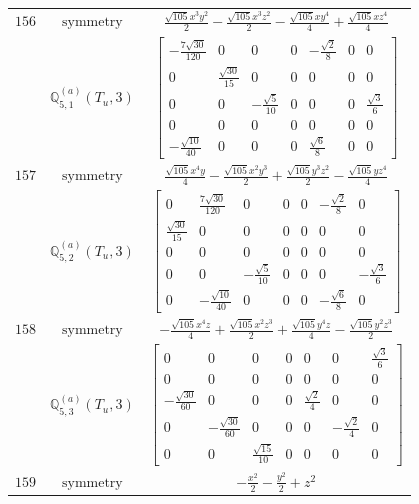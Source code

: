 \documentclass[fleqn,8pt,landscape]{jsarticle}
\begin{document}
\begin{longtable}{ccc}
$ 156 $ & $ \text{symmetry} $ & $ \frac{\sqrt{105} x^{3} y^{2}}{2} - \frac{\sqrt{105} x^{3} z^{2}}{2} - \frac{\sqrt{105} x y^{4}}{4} + \frac{\sqrt{105} x z^{4}}{4} $ \\
$  $ & $ \mathbb{Q}_{5,1}^{(a)}(T_{u},3) $ & $ \begin{bmatrix} - \frac{7 \sqrt{30}}{120} & 0 & 0 & 0 & - \frac{\sqrt{2}}{8} & 0 & 0 \\ 0 & \frac{\sqrt{30}}{15} & 0 & 0 & 0 & 0 & 0 \\ 0 & 0 & - \frac{\sqrt{5}}{10} & 0 & 0 & 0 & \frac{\sqrt{3}}{6} \\ 0 & 0 & 0 & 0 & 0 & 0 & 0 \\ - \frac{\sqrt{10}}{40} & 0 & 0 & 0 & \frac{\sqrt{6}}{8} & 0 & 0 \end{bmatrix} $ \\ \hline
$ 157 $ & $ \text{symmetry} $ & $ \frac{\sqrt{105} x^{4} y}{4} - \frac{\sqrt{105} x^{2} y^{3}}{2} + \frac{\sqrt{105} y^{3} z^{2}}{2} - \frac{\sqrt{105} y z^{4}}{4} $ \\
$  $ & $ \mathbb{Q}_{5,2}^{(a)}(T_{u},3) $ & $ \begin{bmatrix} 0 & \frac{7 \sqrt{30}}{120} & 0 & 0 & 0 & - \frac{\sqrt{2}}{8} & 0 \\ \frac{\sqrt{30}}{15} & 0 & 0 & 0 & 0 & 0 & 0 \\ 0 & 0 & 0 & 0 & 0 & 0 & 0 \\ 0 & 0 & - \frac{\sqrt{5}}{10} & 0 & 0 & 0 & - \frac{\sqrt{3}}{6} \\ 0 & - \frac{\sqrt{10}}{40} & 0 & 0 & 0 & - \frac{\sqrt{6}}{8} & 0 \end{bmatrix} $ \\ \hline
$ 158 $ & $ \text{symmetry} $ & $ - \frac{\sqrt{105} x^{4} z}{4} + \frac{\sqrt{105} x^{2} z^{3}}{2} + \frac{\sqrt{105} y^{4} z}{4} - \frac{\sqrt{105} y^{2} z^{3}}{2} $ \\
$  $ & $ \mathbb{Q}_{5,3}^{(a)}(T_{u},3) $ & $ \begin{bmatrix} 0 & 0 & 0 & 0 & 0 & 0 & \frac{\sqrt{3}}{6} \\ 0 & 0 & 0 & 0 & 0 & 0 & 0 \\ - \frac{\sqrt{30}}{60} & 0 & 0 & 0 & \frac{\sqrt{2}}{4} & 0 & 0 \\ 0 & - \frac{\sqrt{30}}{60} & 0 & 0 & 0 & - \frac{\sqrt{2}}{4} & 0 \\ 0 & 0 & \frac{\sqrt{15}}{10} & 0 & 0 & 0 & 0 \end{bmatrix} $ \\ \hline
$ 159 $ & $ \text{symmetry} $ & $ - \frac{x^{2}}{2} - \frac{y^{2}}{2} + z^{2} $ \\

\end{longtable}
\end{document}
